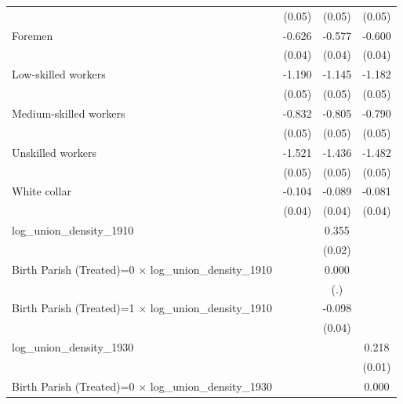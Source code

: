 {\begin{tabular}{l*{3}{c}}
                    &      (0.05)         &      (0.05)         &      (0.05)         \\
Foremen             &      -0.626\sym{***}&      -0.577\sym{***}&      -0.600\sym{***}\\
                    &      (0.04)         &      (0.04)         &      (0.04)         \\
Low-skilled workers &      -1.190\sym{***}&      -1.145\sym{***}&      -1.182\sym{***}\\
                    &      (0.05)         &      (0.05)         &      (0.05)         \\
Medium-skilled workers&      -0.832\sym{***}&      -0.805\sym{***}&      -0.790\sym{***}\\
                    &      (0.05)         &      (0.05)         &      (0.05)         \\
Unskilled workers   &      -1.521\sym{***}&      -1.436\sym{***}&      -1.482\sym{***}\\
                    &      (0.05)         &      (0.05)         &      (0.05)         \\
White collar        &      -0.104\sym{**} &      -0.089\sym{*}  &      -0.081\sym{*}  \\
                    &      (0.04)         &      (0.04)         &      (0.04)         \\
log\_union\_density\_1910&                     &       0.355\sym{***}&                     \\
                    &                     &      (0.02)         &                     \\
Birth Parish (Treated)=0 $\times$ log\_union\_density\_1910&                     &       0.000         &                     \\
                    &                     &         (.)         &                     \\
Birth Parish (Treated)=1 $\times$ log\_union\_density\_1910&                     &      -0.098\sym{*}  &                     \\
                    &                     &      (0.04)         &                     \\
log\_union\_density\_1930&                     &                     &       0.218\sym{***}\\
                    &                     &                     &      (0.01)         \\
Birth Parish (Treated)=0 $\times$ log\_union\_density\_1930&                     &                     &       0.000         \\

\end{tabular}}
